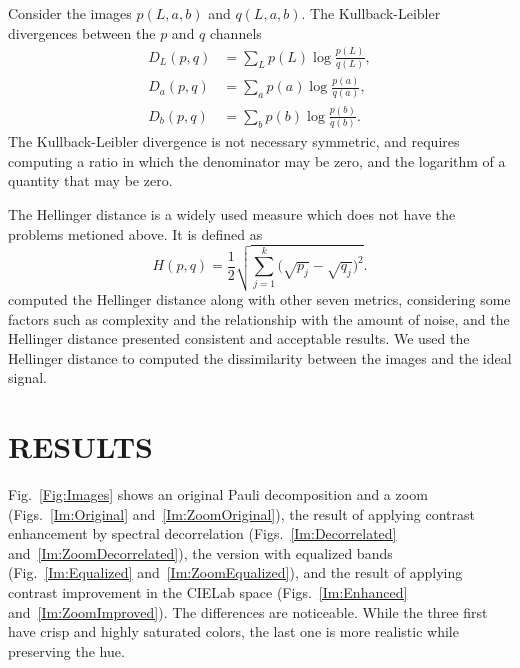 \documentclass{article}
\begin{document}
Consider the images $p(L, a, b)$ and $q(L, a, b)$.
The Kullback-Leibler divergences between the $p$ and $q$ channels
\begin{align}
D_{L}(p,q) & = \sum_{L} p(L) \log\frac{p(L)}{q(L)},\\
D_{a}(p,q) & = \sum_{a} p(a) \log\frac{p(a)}{q(a)},\\
D_{b}(p,q) & = \sum_{b} p(b) \log\frac{p(b)}{q(b)}.
\end{align}
The Kullback-Leibler divergence is not necessary symmetric, and requires computing a ratio in which the denominator may be zero, and the logarithm of a quantity that may be zero.

The Hellinger distance is a widely used measure which does not have the problems metioned above.
It is defined as
\begin{equation}
	H(p, q) = \frac{1}{2}\sqrt{\sum_{j=1}^k \big(\sqrt{p_j} - \sqrt{q_j}\big)^2}.
\end{equation}
\citet{BanchmarckSimiliraty} computed the Hellinger distance along with other seven metrics, considering some factors such as complexity and the relationship with the amount of noise, and the Hellinger distance presented consistent and acceptable results.
We used the Hellinger distance to computed the dissimilarity between the images and the ideal signal.









\section{RESULTS}
\label{Sec:Results}

Fig.~\ref{Fig:Images} shows an original Pauli decomposition and a zoom (Figs.~\ref{Im:Original} and~\ref{Im:ZoomOriginal}),
the result of applying contrast enhancement by spectral decorrelation (Figs.~\ref{Im:Decorrelated} and~\ref{Im:ZoomDecorrelated}),
the version with equalized bands (Fig.~\ref{Im:Equalized} and~\ref{Im:ZoomEqualized}),
and the result of applying contrast improvement in the CIELab space (Figs.~\ref{Im:Enhanced} and~\ref{Im:ZoomImproved}).
The differences are noticeable.
While the three first have crisp and highly saturated colors, the last one is more realistic while preserving the hue.
\end{document}
